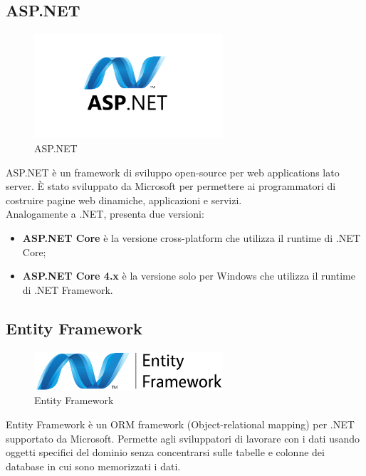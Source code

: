 \subsection{ASP.NET}
\begin{figure}[h]
\begin{center}
	\includegraphics[width=7cm]{images/aspnet.png}
	\caption{ASP.NET}\label{fig:aspnet}
\end{center}
\end{figure}
ASP.NET è un framework di sviluppo open-source per web applications lato server. È stato sviluppato da Microsoft per permettere ai programmatori di costruire pagine web dinamiche, applicazioni e servizi.\cite{ASPNET}\\
Analogamente a .NET, presenta due versioni:
\begin{itemize}
\item \textbf{ASP.NET Core} è la versione cross-platform che utilizza il runtime di .NET Core;
\item \textbf{ASP.NET Core 4.x} è la versione solo per Windows che utilizza il runtime di .NET Framework.
\end{itemize}

\subsection{Entity Framework}
\begin{figure}[h]
\begin{center}
	\includegraphics[width=7cm]{images/entityframework.png}
	\caption{Entity Framework}\label{fig:entityframework}
\end{center}
\end{figure}
Entity Framework è un ORM framework (Object-relational mapping) per .NET supportato da Microsoft. Permette agli sviluppatori di lavorare con i dati usando oggetti specifici del dominio senza concentrarsi sulle tabelle e colonne dei database in cui sono memorizzati i dati.

